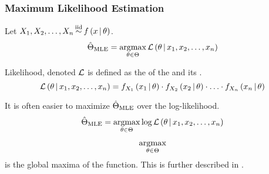\subsubsection{Maximum Likelihood Estimation}\label{subsubsec:Maximum Likelihood Estimation}
\begin{definition}\label{def:Maximum Likelihood Estimation}
  Let $ X_{1},X_{2},\ldots,X_{n} \operatorname{\overset{\text{iid}}{\operatorname{\sim}}} f \left( x \operatorname{\vert} \theta \right) $.
  \begin{equation}\label{eq:Maximum Likelihood Estimation}
    \hat{\Theta}_{\operatorname{\operatorname{MLE}}} = \operatorname*{argmax}_{\theta \in \Theta} \operatorname{\mathcal{L}} \left( \theta \operatorname{\vert} x_{1},x_{2},\ldots,x_{n} \right)
  \end{equation}
  \begin{remark}\label{rmk:Likelihood}
    Likelihood, denoted $\operatorname{\mathcal{L}}$ is defined as the  of the  and its .
    \begin{equation}\label{eq:Likelihood}
      \operatorname{\mathcal{L}} \left( \theta \operatorname{\vert} x_{1},x_{2},\ldots,x_{n} \right) = f_{X_{1}} \left( x_{1} \operatorname{\vert} \theta \right) \cdot f_{X_{2}} \left( x_{2} \operatorname{\vert} \theta \right) \cdot \ldots \cdot f_{X_{n}} \left( x_{n} \operatorname{\vert} \theta \right)
    \end{equation}
  \end{remark}
  \begin{remark}
    It is often easier to maximize $\hat{\Theta}_{\operatorname{\operatorname{MLE}}}$ over the log-likelihood.
    \begin{equation*}
      \hat{\Theta}_{\operatorname{\operatorname{MLE}}} = \operatorname*{argmax}_{\theta \in \Theta} \log \operatorname{\mathcal{L}} \left( \theta \operatorname{\vert} x_{1},x_{2},\ldots,x_{n} \right)
    \end{equation*}
  \end{remark}
  \begin{remark}
    \[ \operatorname*{argmax}_{\theta \in \Theta} \] is the global maxima of the function. This is further described in .
  \end{remark}
\end{definition}

